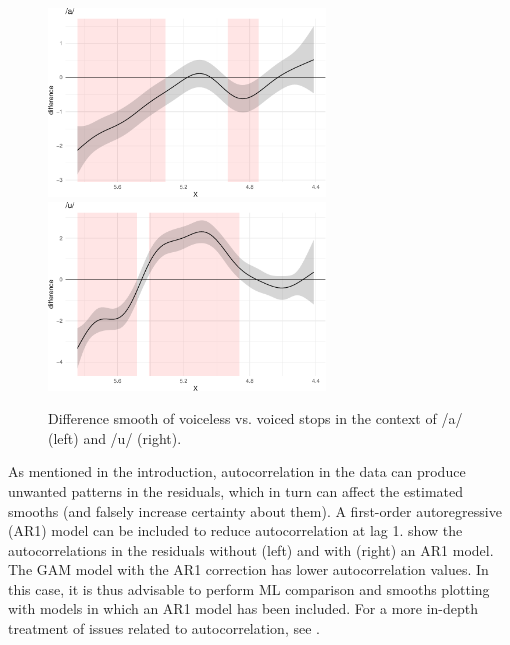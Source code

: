 \documentclass[12pt,]{article}
\begin{document}
\begin{figure}

{\centering \includegraphics[width=.7\linewidth,height=5cm]{2018-polar-gam_files/figure-latex/diff-it01-1} \includegraphics[width=.7\linewidth,height=5cm]{2018-polar-gam_files/figure-latex/diff-it01-2} 

}

\caption{Difference smooth of voiceless vs. voiced stops in the context of /a/ (left) and /u/ (right).}\label{f:diff-it01}
\end{figure}

As mentioned in the introduction, autocorrelation in the data can
produce unwanted patterns in the residuals, which in turn can affect the
estimated smooths (and falsely increase certainty about them). A
first-order autoregressive (AR1) model can be included to reduce
autocorrelation at lag 1.  show the autocorrelations in
the residuals without (left) and with (right) an AR1 model. The GAM
model with the AR1 correction has lower autocorrelation values. In this
case, it is thus advisable to perform ML comparison and smooths plotting
with models in which an AR1 model has been included. For a more in-depth
treatment of issues related to autocorrelation, see
\citet{soskuthy2017}.
\end{document}
